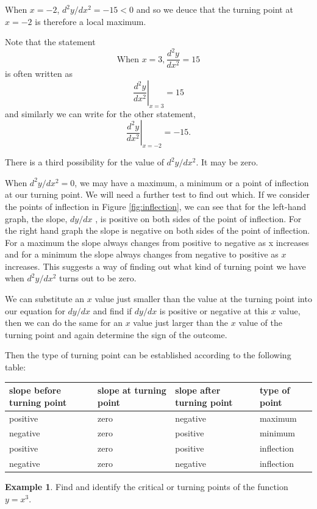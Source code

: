 \documentclass[
  11pt,
  oneside]{book}
\newcommand{\slide}{}
\theoremstyle{definition}
\theoremstyle{definition}
\newtheorem{example}{Example}[chapter]
\theoremstyle{definition}
\theoremstyle{definition}
\theoremstyle{remark}
\begin{document}
When \(x = -2\), \(d^2y/dx^2 = -15 < 0\) and so we deuce that the turning point at \(x = -2\) is therefore a local maximum.

Note that the statement
\[
\text{When }x = 3, \frac{d^2y}{dx^2} = 15
\]
is often written as
\[
\left.\frac{d^2y}{dx^2}\right\vert_{x=3} = 15
\]
and similarly we can write for the other statement,
\[
\left.\frac{d^2y}{dx^2}\right\vert_{x=-2} = -15.
\]
\slide

There is a third possibility for the value of \(d^2y/dx^2\). It may be zero.

When \(d^2y/dx^2=0\), we may have a maximum, a minimum or a point of inflection at our turning point. We will need a further test to find out which. If we consider the points of inflection in Figure \ref{fig:inflection}, we can see that for the left-hand graph, the slope, \(dy/dx\) , is positive on both sides of the point of inflection. For the right hand graph the slope is negative on both sides of the point of inflection. For a maximum the slope always changes from positive to negative as x increases and for a minimum the slope always changes from negative to positive as \(x\) increases. This suggests a way of finding out what kind of turning point we have when \(d^2y/dx^2\) turns out to be zero.

We can substitute an \(x\) value just smaller than the value at the turning point into our equation for \(dy/dx\) and find if \(dy/dx\) is positive or negative at this \(x\) value, then we can do the same for an \(x\) value just larger than the \(x\) value of the turning point and again determine the sign of the outcome.
\slide

Then the type of turning point can be established according to the following table:

\begin{tabular}{l|l|l|l}
\hline
slope before turning point & slope at turning point & slope after turning point & type of point\\
\hline
positive & zero & negative & maximum\\
\hline
negative & zero & positive & minimum\\
\hline
positive & zero & positive & inflection\\
\hline
negative & zero & negative & inflection\\
\hline
\end{tabular}
\slide

\begin{example}
Find and identify the critical or turning points of the function \(y=x^3\).
\end{example}
\end{document}
